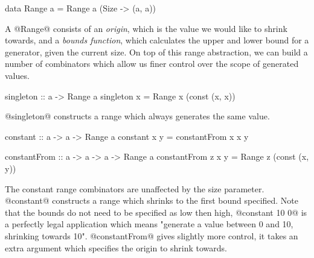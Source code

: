 \begin{code}
  data Range a =
    Range a (Size -> (a, a))
\end{code}

A @Range@ consists of an \emph{origin}, which is the value we would like to shrink towards, and a \emph{bounds function}, which calculates the upper and lower bound for a generator, given the current size. On top of this range abstraction, we can build a number of combinators which allow us finer control over the scope of generated values.

\begin{code}
  singleton :: a -> Range a
  singleton x =
    Range x (const (x, x))
\end{code}

@singleton@ constructs a range which always generates the same value. 

\begin{code}
  constant :: a -> a -> Range a
  constant x y =
    constantFrom x x y

  constantFrom :: a -> a -> a -> Range a
  constantFrom z x y =
    Range z (const (x, y))
\end{code}

The constant range combinators are unaffected by the size parameter. @constant@ constructs a range which shrinks to the first bound specified. Note that the bounds do not need to be specified as low then high, @constant 10 0@ is a perfectly legal application which means "generate a value between 0 and 10, shrinking towards 10". @constantFrom@ gives slightly more control, it takes an extra argument which specifies the origin to shrink towards.


%
%

